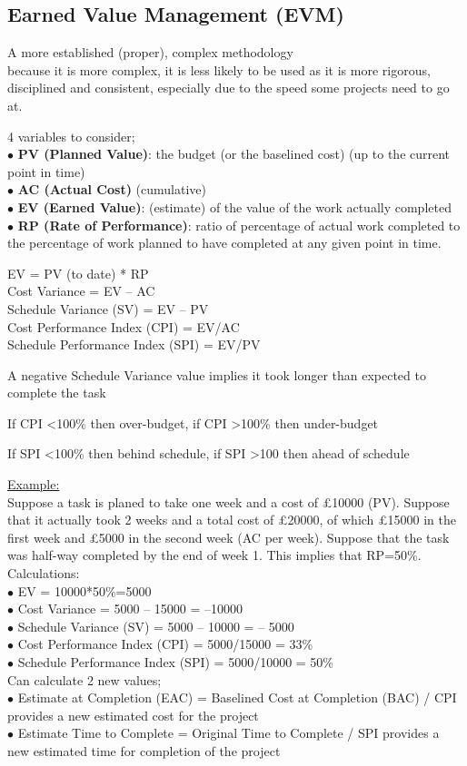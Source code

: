 \documentclass[]{project_plan}
\newcommand{\bulletPoint}{\hspace{-3.1pt}$\bullet$ \hspace{5pt}}
\begin{document}
\subsection{Earned Value Management (EVM)}

A more established (proper), complex methodology\\
because it is more complex, it is less likely to be used as it is more
rigorous, disciplined and consistent, especially due to the speed some
projects need to go at.

4 variables to consider;\\
\bulletPoint \textbf{PV (Planned Value)}: the budget (or the baselined cost) (up to the current point in time)\\
\bulletPoint \textbf{AC (Actual Cost)} (cumulative)\\
\bulletPoint \textbf{EV (Earned Value)}: (estimate) of the value of the work actually completed\\
\bulletPoint \textbf{RP (Rate of Performance)}: ratio of percentage of actual work completed to the percentage of work planned to have completed at any given point in time.

EV = PV (to date) * RP\\
Cost Variance = EV – AC\\
Schedule Variance (SV) = EV – PV\\
Cost Performance Index (CPI) = EV/AC\\
Schedule Performance Index (SPI) = EV/PV

A negative Schedule Variance value implies it took longer than expected to complete the task

If CPI \textless 100\% then over-budget, if CPI \textgreater 100\% then under-budget

If SPI \textless 100\% then behind schedule, if SPI \textgreater 100 then ahead of schedule

\underline{Example:}\\
Suppose a task is planed to take one week and a cost of £10000 (PV). Suppose that it actually took 2 weeks and a
total cost of £20000, of which £15000 in the first week and £5000 in the second week (AC per week). Suppose that the task
was half-way completed by the end of week 1. This implies that RP=50\%.\\
Calculations:\\
\bulletPoint EV = 10000*50\%=5000\\
\bulletPoint Cost Variance = 5000 – 15000 = –10000\\
\bulletPoint Schedule Variance (SV) = 5000 – 10000 = – 5000\\
\bulletPoint Cost Performance Index (CPI) = 5000/15000 = 33\%\\
\bulletPoint Schedule Performance Index (SPI) = 5000/10000 = 50\%\\
Can calculate 2 new values;\\
\bulletPoint Estimate at Completion (EAC) = Baselined Cost at Completion (BAC) / CPI provides a new estimated cost for the project\\
\bulletPoint Estimate Time to Complete = Original Time to Complete / SPI provides a new estimated time for completion of the project
\end{document}
